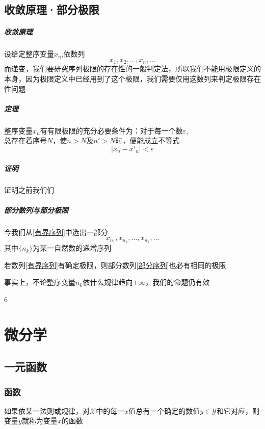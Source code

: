 \documentclass[12pt,a4paper]{report}
\begin{document}
\section{收敛原理·部分极限}
\paragraph{收敛原理} 
设给定整序变量$x_n$,依数列
\begin{equation}
    x_1,x_2,\dots,x_n,\dots
    \label{有界序列}
\end{equation}
而递变，我们要研究序列极限的存在性的一般判定法，所以我们不能用极限定义的本身，因为极限定义中已经用到了这个极限，我们需要仅用这数列来判定极限存在性问题\par
    \paragraph*{定理} 整序变量$x_n$有有限极限的充分必要条件为：对于每一个数$\varepsilon$, \\
    总存在着序号$N$，使$n>N$及$n'>N$时，便能成立不等式
    $$\left\lvert x_n-x'_n\right\rvert <\varepsilon$$
    \paragraph{证明} 证明之前我们们
\paragraph{部分数列与部分极限}
今我们从\eqref{有界序列}中选出一部分
\begin{equation}
    x_{n_1},x_{n_2},\dots,x_{n_k},\dots
    \label{部分序列}
\end{equation}
其中$\{n_k\}$为某一自然数的递增序列\par
若数列\eqref{有界序列}有确定极限，则部分数列\eqref{部分序列}也必有相同的极限\par
事实上，不论整序变量$n_k$依什么规律趋向$+\infty$，我们的命题仍有效\par 
6
\newpage
\chapter{微分学}
\section{一元函数}
\subsection{函数}
如果依某一法则或规律，对$\mathcal{X}$中的每一$x$值总有一个确定的数值$y \in \mathcal{Y} $和它对应，则变量$y$就称为变量$x$的函数
\end{document}
